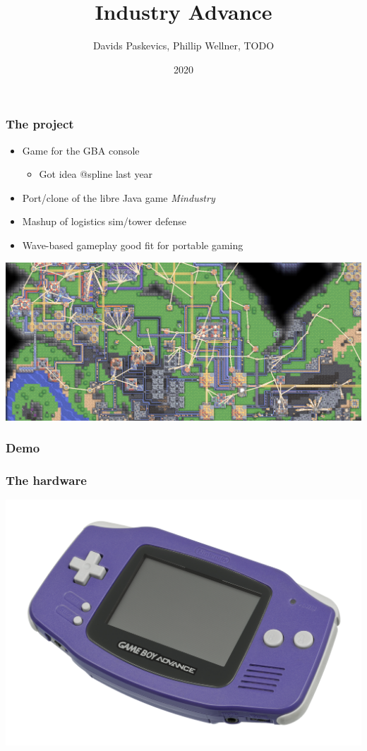 \documentclass{beamer}
\title{Industry Advance}
\author{Davids Paskevics, Phillip Wellner, TODO}
\institute{FU Berlin}
\date{2020}
\begin{document}
\frame{\titlepage}

\begin{frame}
\frametitle{The project}
\begin{itemize}
	\item Game for the GBA console \begin{itemize}
		\item Got idea @spline last year 
	\end{itemize}
    \item Port/clone of the libre Java game \emph{Mindustry}
    \item Mashup of logistics sim/tower defense
    \item Wave-based gameplay good fit for portable gaming
\end{itemize}
\end{frame}

\begin{frame}
\includegraphics[scale=0.4]{images/mindustry.png}
\end{frame}

\begin{frame}
\frametitle{Demo}
\end{frame}



\begin{frame}
\frametitle{The hardware}
\includegraphics[scale=0.28]{images/Nintendo-Game-Boy-Advance-Purple-FL.jpg}
\end{frame}
\end{document}
